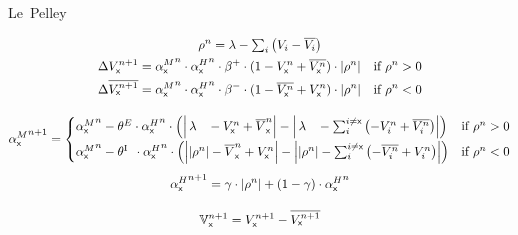 \documentclass[border=10pt,varwidth=14cm]{standalone}
\begin{document}
\newcommand{\eks}{\textsf{x}}
\newcommand{\longlambda}{\rlap{$\,\lambda$}\phantom{\left| \rho^n \right|}}
\newcommand{\longI}{\rlap{\textsuperscript{I}}\phantom{E}}
\newcommand{\VNet}{\mathbb{V}}

\begin{center}
	\huge
	\sffamily
	Le~Pelley
\end{center}
\begin{gather*}
	\begin{gathered}
		\rho^n = \lambda - \textstyle\sum_i \left( V_i - \overline{V_i} \right) \\
		\begin{aligned}
			\Delta V_\eks^{n + 1} &= {\alpha^M_\eks}^n \cdot {\alpha^H_\eks}^n \cdot \beta^+ \cdot (1 - V_\eks^n + \overline{V_\eks^n}) \cdot \left| \rho^n \right| & \text{if } \rho^n > 0 \\
			 \Delta \overline{V_\eks^{n + 1}} &= {\alpha^M_\eks}^n \cdot {\alpha^H_\eks}^n \cdot \beta^- \cdot (1 - \overline{V_\eks^n} + V_\eks^n) \cdot \left| \rho^n \right| & \text{if } \rho^n < 0
		\end{aligned}
	\end{gathered} \\[1em]
	\begin{gathered}
		{\alpha^M_\eks}^{n + 1} =
			\begin{cases}
				{\alpha^M_\eks}^n - \theta^E \cdot {\alpha^H_\eks}^n \cdot \left( \left| \longlambda - V_\eks^n + \overline{V}_\eks^n \right| - \left| \longlambda - \textstyle\sum_i^{i \neq \eks} \left( - V_i^n + \overline{V_i^n} \right) \right| \right) & \text{if } \rho^n > 0 \\[1ex]
				 {\alpha^M_\eks}^n -\theta{\longI{}} \cdot {\alpha^H_\eks}^n \cdot \left( \left| \left| \rho^n \right| - \overline{V}_\eks^n + V_\eks^n \right| - \left| \left| \rho^n \right| - \textstyle\sum_i^{i \neq \eks} \left( - \overline{V_i^n} + V_i^n \right) \right| \right) & \text{if } \rho^n < 0
			\end{cases} \\[1ex]
				{\alpha^H_\eks}^{n + 1} = \gamma \cdot \left| \rho^n \right| + \left( 1 - \gamma \right) \cdot {\alpha^H_\eks}^{n}
	\end{gathered} \\[1em]
	\VNet{}_\eks^{n + 1} = V_\eks^{n + 1} - \overline{V_\eks^{n + 1}}
\end{gather*}


\end{document}
